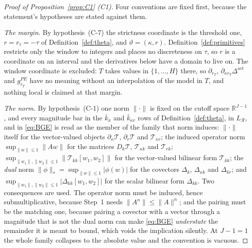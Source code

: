 \documentclass[11pt]{article}
\newcommand{\Dact}{\Delta^{\mathrm{act}}}
\newcommand{\Tmap}{\mathcal{T}}
\begin{document}
\begin{proof}[Proof of Proposition~\ref{prop:C1} (C1)]
Four conventions are fixed first, because the statement's hypotheses are stated against them.

\emph{The margin.} By hypothesis~(C-7) the strictness coordinate is the threshold one,
$r = r_\tau = -\tau$ of Definition~\ref{def:theta}, and $\vartheta = (\kappa,r)$.
Definition~\ref{def:primitives} restricts only the window to integers and places no discreteness on
$\tau$, so $r$ is a coordinate on an interval and the derivatives below have a domain to live on.
The window coordinate is excluded: $T$ takes values in $\{1,\dots,H\}$ there, so $\partial_{r_T}$,
$\partial_{\kappa r_T}\Dact$ and $g_{r_T}^{PE}$ have no meaning without an interpolation of the
model in $T$, and nothing local is claimed at that margin.

\emph{The norm.} By hypothesis~(C-1) one norm $\lVert\cdot\rVert$ is fixed on the cutoff space
$\mathbb R^{J-1}$, and every magnitude bar in the $\bar k_x$ and $\bar k_{\kappa r}$ rows of
Definition~\ref{def:theta}, in $L_{\mathcal R}$, and in \eqref{eq:BGE} is read as the member of the
family that norm induces: $\lVert\cdot\rVert$ itself for the vector-valued objects
$\partial_\kappa\Tmap$, $\partial_r\Tmap$ and $\Tmap_{\kappa r}$; the induced operator norm
$\sup_{\lVert w\rVert\le1}\lVert Aw\rVert$ for the matrices $D_k\Tmap$, $\Tmap_{\kappa k}$ and
$\Tmap_{rk}$; $\sup_{\lVert w_1\rVert,\lVert w_2\rVert\le1}\lVert\Tmap_{kk}[w_1,w_2]\rVert$ for the
vector-valued bilinear form $\Tmap_{kk}$; the \emph{dual} norm
$\lVert\phi\rVert_* = \sup_{\lVert w\rVert\le1}\lvert\phi(w)\rvert$ for the covectors $\Delta_k$,
$\Delta_{\kappa k}$ and $\Delta_{kr}$; and
$\sup_{\lVert w_1\rVert,\lVert w_2\rVert\le1}\lvert\Delta_{kk}[w_1,w_2]\rvert$ for the scalar
bilinear form $\Delta_{kk}$. Two consequences are used. The operator norm must be induced, hence
submultiplicative, because Step~1 needs $\lVert A^n\rVert \le \lVert A\rVert^n$; and the pairing
must be the matching one, because pairing a covector with a vector through a magnitude that is not
the dual norm can make \eqref{eq:BGE} \emph{understate} the remainder it is meant to bound, which
voids the implication silently. At $J-1 = 1$ the whole family collapses to the absolute value and
the convention is vacuous.


\end{proof}
\end{document}
